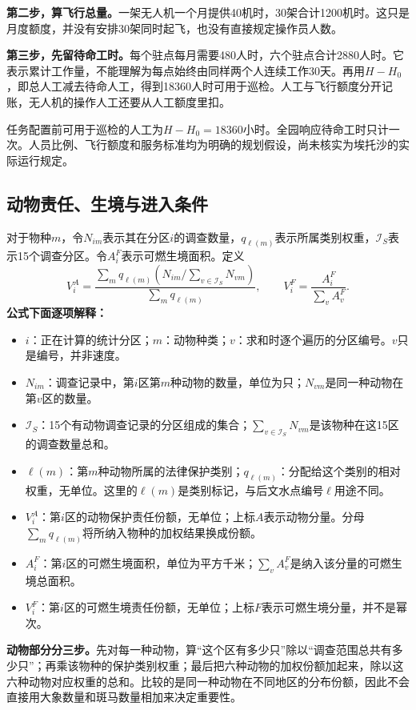 \documentclass[12pt,a4paper]{article}
\numberwithin{equation}{section}
\begin{document}
\noindent\textbf{第二步，算飞行总量。}一架无人机一个月提供40机时，30架合计1200机时。这只是月度额度，并没有安排30架同时起飞，也没有直接规定操作员人数。

\noindent\textbf{第三步，先留待命工时。}每个驻点每月需要480人时，六个驻点合计2880人时。它表示累计工作量，不能理解为每点始终由同样两个人连续工作30天。再用$H-H_0$，即总人工减去待命人工，得到18360人时可用于巡检。人工与飞行额度分开记账，无人机的操作人工还要从人工额度里扣。

任务配置前可用于巡检的人工为$H-H_0=18360$小时。全园响应待命工时只计一次。人员比例、飞行额度和服务标准均为明确的规划假设，尚未核实为埃托沙的实际运行规定。
\clearpage

\subsection{动物责任、生境与进入条件}
对于物种$m$，令$N_{im}$表示其在分区$i$的调查数量，$q_{\ell(m)}$表示所属类别权重，$\mathcal I_S$表示15个调查分区。令$A_i^F$表示可燃生境面积。定义
\begin{equation}
V_i^A=\frac{\sum_m q_{\ell(m)}(N_{im}/\sum_{v\in\mathcal I_S}N_{vm})}{\sum_mq_{\ell(m)}},
\qquad V_i^F=\frac{A_i^F}{\sum_vA_v^F}.
\label{eq:values}
\end{equation}
\noindent\textbf{公式下面逐项解释：}
\begin{itemize}
\item $i$：正在计算的统计分区；$m$：动物种类；$v$：求和时逐个遍历的分区编号。$v$只是编号，并非速度。
\item $N_{im}$：调查记录中，第$i$区第$m$种动物的数量，单位为只；$N_{vm}$是同一种动物在第$v$区的数量。
\item $\mathcal I_S$：15个有动物调查记录的分区组成的集合；$\sum_{v\in\mathcal I_S}N_{vm}$是该物种在这15区的调查数量总和。
\item $\ell(m)$：第$m$种动物所属的法律保护类别；$q_{\ell(m)}$：分配给这个类别的相对权重，无单位。这里的$\ell(m)$是类别标记，与后文水点编号$\ell$用途不同。
\item $V_i^A$：第$i$区的动物保护责任份额，无单位；上标$A$表示动物分量。分母$\sum_m q_{\ell(m)}$将所纳入物种的加权结果换成份额。
\item $A_i^F$：第$i$区的可燃生境面积，单位为平方千米；$\sum_v A_v^F$是纳入该分量的可燃生境总面积。
\item $V_i^F$：第$i$区的可燃生境责任份额，无单位；上标$F$表示可燃生境分量，并不是幂次。
\end{itemize}
\noindent\textbf{动物部分分三步。}先对每一种动物，算“这个区有多少只”除以“调查范围总共有多少只”；再乘该物种的保护类别权重；最后把六种动物的加权份额加起来，除以这六种动物对应权重的总和。比较的是同一种动物在不同地区的分布份额，因此不会直接用大象数量和斑马数量相加来决定重要性。
\end{document}
